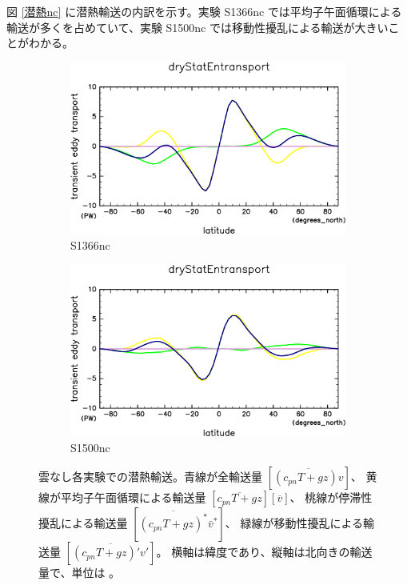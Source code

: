 \documentclass[body]{subfiles}
\begin{document}
図 \ref{潜熱nc} に潜熱輸送の内訳を示す。実験 S1366nc では平均子午面循環による
輸送が多くを占めていて、実験 S1500nc では移動性擾乱による輸送が大きいことがわかる。

\begin{figure}[t]
	\centering
	\begin{subfigure}{.4\textwidth}
		\centering
		\includegraphics[width=\textwidth]{S1366-nc/MeriHeatTrans@dryStatEn,time=3650:4015-crop-rotate.pdf}
		\caption{S1366nc}\label{乾燥静的エネルギーS1366nc}
	\end{subfigure}
	\begin{subfigure}{.4\textwidth}
		\centering
		\includegraphics[width=\textwidth]{S1500-nc/MeriHeatTrans@dryStatEn,time=3650:4015-crop-rotate.pdf}
		\caption{S1500nc}\label{乾燥静的エネルギーS1500nc}
	\end{subfigure}
	\caption[雲なし各実験での乾燥静的エネルギー輸送の内訳]{
		雲なし各実験での潜熱輸送。青線が全輸送量 \([\overline{(c_{pn}T+gz)v}]\)、
		黄線が平均子午面循環による輸送量 \([\overline{c_{pn}T+gz}][\overline{v}]\)、
		桃線が停滞性擾乱による輸送量 \([\overline{(c_{pn}T+gz)^*}\bar v^*]\)、
		緑線が移動性擾乱による輸送量 \([\overline{(c_{pn}T+gz)'v'}]\)。
		横軸は緯度であり、縦軸は北向きの輸送量で、単位は 。
	}\label{乾燥静的エネルギーnc}
\end{figure}
\end{document}
